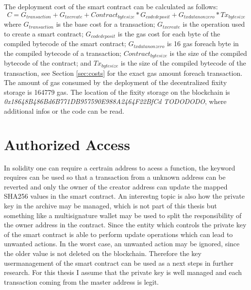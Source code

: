 The deployment cost of the smart contract can be calculated as follows:
\begin{equation}\label{eq:gas-cost}
    C = G_{transaction} + G_{txcreate} + Contract_{bytesize}*G_{codedeposit} + G_{txdatanonzero} * Tx_{bytesize}
\end{equation}
where \textit{$G_{transaction}$} is the base cost for a transaction; \textit{$G_{txcreate}$} is the operation used to create a smart contract; \textit{$G_{codedeposit}$} is the gas cost for each byte of the compiled bytecode of the smart contract; \textit{$G_{txdatanonzero}$} is 16 gas foreach byte in the compiled bytecode of a transaction; \textit{$Contract_{bytesize}$} is the size of the compiled bytecode of the contract; and \textit{$Tx_{bytesize}$} is the size of the compiled bytecode of the transaction, see Section \ref{sec:costs} for the exact gas amount foreach transaction.
The amount of gas consumed by the deployment of the decentralized fixity storage is 164779 gas.
The location of the fixity storage on the blockchain is \textit{0x18648B486Bd6B771DB957590E988A2464F22BfCd TODODODO}, where additional infos or the code can be read.
\section{Authorized Access}
In solidity one can require a certrain address to acess a function, the keyword requires can be used  so that a transaction from a unknown address can be reverted and only the owner of the creator address can update the mapped SHA256 values in the smart contract. An interestng topic is also how the private key in the archive may be managed, which is not part of this thesis but something like a multisignature wallet may be used to split the responsibility of the owner address in the contract. Since the entity which controls the private key of the smart contract is able to perform update operations which can lead to unwanted actions. In the worst case, an unwanted action may be ignored, since the older value is not deleted on the blockchain. Therefore the key usermanagement of the smart contract can be used as a next steps in further research. For this thesis I assume that the private key is well managed and each transaction coming from the master address is legit.